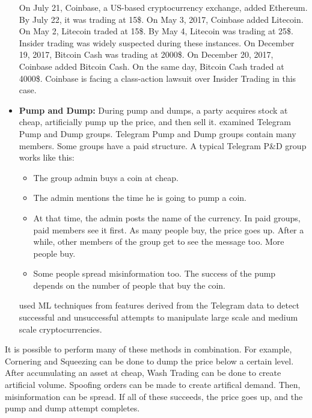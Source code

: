 \documentclass[letterpaper]{article}
\begin{document}
\begin{itemize}
    On July 21, Coinbase, a US-based cryptocurrency exchange, added Ethereum. By July 22, it was trading at 15\$. 
    On May 3, 2017, Coinbase added Litecoin. On May 2, Litecoin traded at 15\$. By May 4, Litecoin was trading at 
    25\$. Insider trading was widely suspected during these instances. On December 19, 2017, Bitcoin Cash 
    was trading at 2000\$. On December 20, 2017, Coinbase added Bitcoin Cash. On the same day, Bitcoin Cash 
    traded at 4000\$. Coinbase is facing a class-action lawsuit over Insider Trading in this case. \cite{zhao_2018}
    \item \textbf{Pump and Dump:} During pump and dumps, a party acquires stock at cheap, artificially pump up the 
    price, and then sell it. \cite{mirtaheri2019identifying,xu2019anatomy} 
    examined Telegram Pump and Dump groups. Telegram Pump and Dump groups contain many members. Some groups 
    have a paid structure. A typical Telegram P\&D group works like this:

    \begin{itemize}
        \item The group admin buys a coin at cheap.
        \item The admin mentions the time he is going to pump a coin.
        \item At that time, the admin posts the name of the currency. In paid groups, paid members 
        see it first. As many people buy, the price goes up. After a while, other members 
        of the group get to see the message too. More people buy.
        \item Some people spread misinformation too. The success of the pump depends on the number of 
        people that buy the coin.
    \end{itemize}
 
    \cite{xu2019anatomy} used ML techniques from features derived from the Telegram data to detect 
    successful and unsuccessful attempts to manipulate large scale and medium scale cryptocurrencies. 
\end{itemize}

It is possible to perform many of these methods in combination.
For example, Cornering and Squeezing can be done to dump the price below a certain level. After accumulating 
an asset at cheap, Wash Trading can be done to create artificial volume. Spoofing orders can be made to create 
artifical demand. Then, misinformation can be spread. If all of these succeeds, the price goes up, and the pump and dump 
attempt completes.
\end{document}
